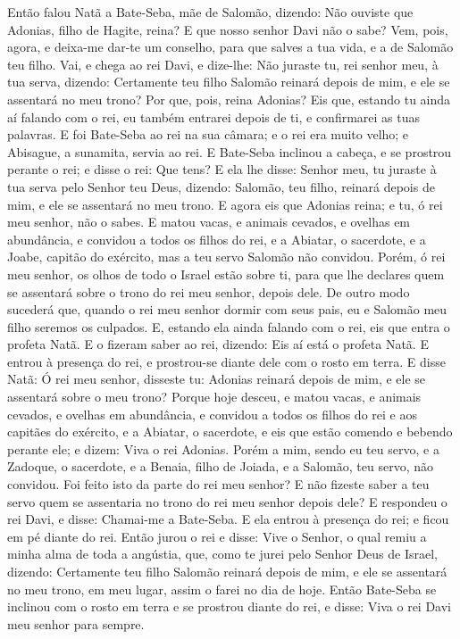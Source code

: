 Então falou Natã a Bate-Seba, mãe de Salomão, dizendo: Não
ouviste que Adonias, filho de Hagite, reina? E que nosso senhor Davi
não o sabe? Vem, pois, agora, e deixa-me dar-te um conselho,
para que salves a tua vida, e a de Salomão teu filho. Vai, e
chega ao rei Davi, e dize-lhe: Não juraste tu, rei senhor meu, à tua
serva, dizendo: Certamente teu filho Salomão reinará depois de mim,
e ele se assentará no meu trono? Por que, pois, reina Adonias?
Eis que, estando tu ainda aí falando com o rei, eu também
entrarei depois de ti, e confirmarei as tuas palavras. E foi
Bate-Seba ao rei na sua câmara; e o rei era muito velho; e Abisague,
a sunamita, servia ao rei. E Bate-Seba inclinou a cabeça, e
se prostrou perante o rei; e disse o rei: Que tens? E ela lhe
disse: Senhor meu, tu juraste à tua serva pelo Senhor teu Deus,
dizendo: Salomão, teu filho, reinará depois de mim, e ele se
assentará no meu trono. E agora eis que Adonias reina; e tu,
ó rei meu senhor, não o sabes. E matou vacas, e animais
cevados, e ovelhas em abundância, e convidou a todos os filhos do
rei, e a Abiatar, o sacerdote, e a Joabe, capitão do exército, mas a
teu servo Salomão não convidou. Porém, ó rei meu senhor, os
olhos de todo o Israel estão sobre ti, para que lhe declares quem se
assentará sobre o trono do rei meu senhor, depois dele. De
outro modo sucederá que, quando o rei meu senhor dormir com seus
pais, eu e Salomão meu filho seremos os culpados. E, estando
ela ainda falando com o rei, eis que entra o profeta Natã. E
o fizeram saber ao rei, dizendo: Eis aí está o profeta Natã. E
entrou à presença do rei, e prostrou-se diante dele com o rosto em
terra. E disse Natã: Ó rei meu senhor, disseste tu: Adonias
reinará depois de mim, e ele se assentará sobre o meu trono?
Porque hoje desceu, e matou vacas, e animais cevados, e
ovelhas em abundância, e convidou a todos os filhos do rei e aos
capitães do exército, e a Abiatar, o sacerdote, e eis que estão
comendo e bebendo perante ele; e dizem: Viva o rei Adonias.
Porém a mim, sendo eu teu servo, e a Zadoque, o sacerdote, e
a Benaia, filho de Joiada, e a Salomão, teu servo, não convidou.
Foi feito isto da parte do rei meu senhor? E não fizeste
saber a teu servo quem se assentaria no trono do rei meu senhor
depois dele? E respondeu o rei Davi, e disse: Chamai-me a
Bate-Seba. E ela entrou à presença do rei; e ficou em pé diante do
rei. Então jurou o rei e disse: Vive o Senhor, o qual remiu a
minha alma de toda a angústia, que, como te jurei pelo Senhor
Deus de Israel, dizendo: Certamente teu filho Salomão reinará depois
de mim, e ele se assentará no meu trono, em meu lugar, assim o farei
no dia de hoje. Então Bate-Seba se inclinou com o rosto em
terra e se prostrou diante do rei, e disse: Viva o rei Davi meu
senhor para sempre.

